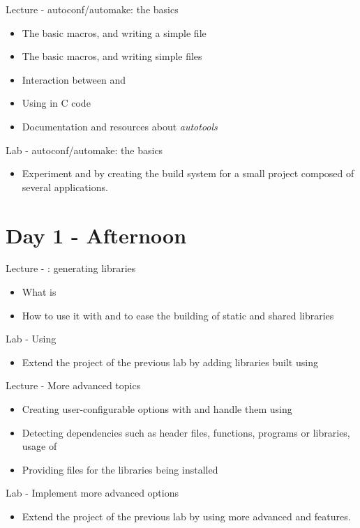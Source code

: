 \documentclass[a4paper,12pt,obeyspaces,spaces,hyphens]{article}
\begin{document}
\feagendatwocolumn
{Lecture - autoconf/automake: the basics}
{
  \begin{itemize}
  \item The basic  macros, and writing a simple
     file
  \item The basic  macros, and writing simple
     files
  \item Interaction between  and 
  \item Using  in C code
  \item Documentation and resources about {\em autotools}
  \end{itemize}
}
{Lab - autoconf/automake: the basics}
{
  \begin{itemize}
  \item Experiment  and  by creating the
    build system for a small project composed of several applications.
  \end{itemize}
}

\section{Day 1 - Afternoon}

\feagendatwocolumn
{Lecture - : generating libraries}
{
  \begin{itemize}
  \item What is 
  \item How to use it with  and  to ease
    the building of static and shared libraries
  \end{itemize}
}
{Lab - Using }
{
  \begin{itemize}
  \item Extend the project of the previous lab by adding libraries
    built using 
  \end{itemize}
}

\feagendatwocolumn
{Lecture - More advanced topics}
{
  \begin{itemize}
  \item Creating user-configurable options with  and
    handle them using 
  \item Detecting dependencies such as header files, functions,
    programs or libraries, usage of 
  \item Providing  files for the libraries being
    installed
  \end{itemize}
}
{Lab - Implement more advanced options}
{
  \begin{itemize}
  \item Extend the project of the previous lab by using more advanced
     and  features.
  \end{itemize}
}
\end{document}

